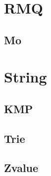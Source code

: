 \section{RMQ}

\subsection{Mo}



\section{String}

\subsection{KMP}

\subsection{Trie}

\subsection{Zvalue}
